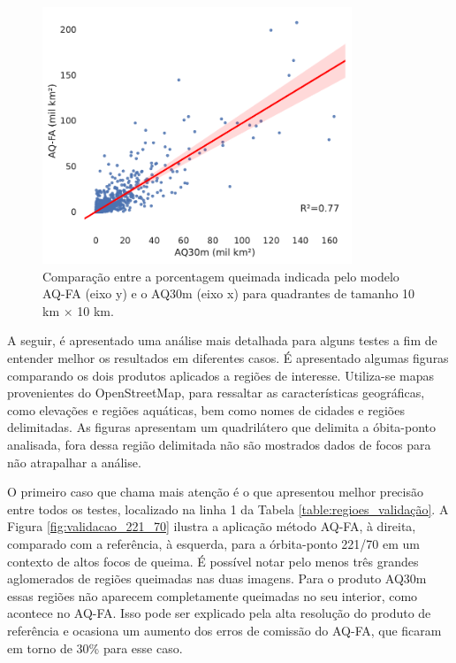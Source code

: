 \documentclass[cic,tc]{iiufrgs}
\begin{document}
\begin{figure}[!htb]
    \caption{Comparação entre a porcentagem queimada indicada pelo modelo AQ-FA (eixo y) e o AQ30m (eixo x) para quadrantes de tamanho 10 km $\times$ 10 km.}
    \begin{center}
        \includegraphics[width=25em]{regressao_aq30m}
    \end{center}
    \label{fig:regressao_aq30m}
\end{figure}


A seguir, é apresentado uma análise mais detalhada para alguns testes a fim de entender melhor os resultados em diferentes casos. É apresentado algumas figuras comparando os dois produtos aplicados a regiões de interesse. Utiliza-se mapas provenientes do OpenStreetMap, para ressaltar as características geográficas, como elevações e regiões aquáticas, bem como nomes de cidades e regiões delimitadas. As figuras apresentam um quadrilátero que delimita a óbita-ponto analisada, fora dessa região delimitada não são mostrados dados de focos para não atrapalhar a análise.

O primeiro caso que chama mais atenção é o que apresentou melhor precisão entre todos os testes, localizado na linha 1 da Tabela \ref{table:regioes_validação}. A Figura \ref{fig:validacao_221_70} ilustra a aplicação método AQ-FA, à direita, comparado com a referência, à esquerda, para a órbita-ponto 221/70 em um contexto de altos focos de queima. É possível notar pelo menos três grandes aglomerados de regiões queimadas nas duas imagens. Para o produto AQ30m essas regiões não aparecem completamente queimadas no seu interior, como acontece no AQ-FA. Isso pode ser explicado pela alta resolução do produto de referência e ocasiona um aumento dos erros de comissão do AQ-FA, que ficaram em torno de 30\% para esse caso. 
\end{document}
